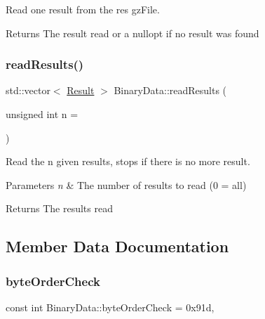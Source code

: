 Read one result from the res gz\+File. 

\begin{DoxyReturn}{Returns}
The result read or a nullopt if no result was found 
\end{DoxyReturn}
\mbox{\label{classBinaryData_a0faec96c84437c29694d2e54689b7f07}} 
\subsubsection{\texorpdfstring{read\+Results()}{readResults()}}
{\footnotesize\ttfamily std\+::vector$<$ \hyperlink{classResult}{Result} $>$ Binary\+Data\+::read\+Results (\begin{DoxyParamCaption}\item[{unsigned int}]{n = {} }\end{DoxyParamCaption})}



Read the n given results, stops if there is no more result. 


\begin{DoxyParams}{Parameters}
{\em n} & The number of results to read (0 = all) \\
\hline
\end{DoxyParams}
\begin{DoxyReturn}{Returns}
The results read 
\end{DoxyReturn}


\subsection{Member Data Documentation}
\mbox{\label{classBinaryData_a4e95a7b65e2fa6374d92108bb90eaf5b}} 
\subsubsection{\texorpdfstring{byte\+Order\+Check}{byteOrderCheck}}
{\footnotesize\ttfamily const int Binary\+Data\+::byte\+Order\+Check = 0x91d\hspace{0.3cm}{\ttfamily [static]}, {\ttfamily [protected]}}



